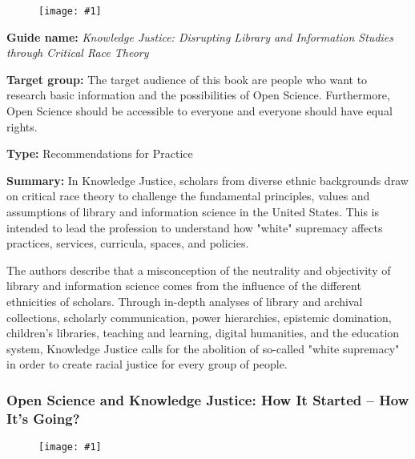 \documentclass{article}
\newlength{\imgwidth}
\newcommand\scaledgraphics[2]{%
                
\settowidth{\imgwidth}{\texttt{[image: \#1]}}%
                
\setlength{\imgwidth}{\minof{\imgwidth}{#2\textwidth}}%
                
\texttt{[image: \#1]}%
                
}
\begin{document}
\begin{center}
\begin{figure}
\scaledgraphics{dcc1d35b-4186-4b50-a5a6-cf54422a8064.jpeg}{0.5}
\label{F29320001}
\end{figure}


\end{center}


\textbf{Guide name:} \emph{Knowledge Justice: Disrupting Library and Information Studies through Critical Race Theory} \autocite{leung_knowledge_2021}


\textbf{Target group: }The target audience of this book are people who want to research basic information and the possibilities of Open Science. Furthermore, Open Science should be accessible to everyone and everyone should have equal rights.


\textbf{Type:} Recommendations for Practice


\textbf{Summary: }In Knowledge Justice, scholars from diverse ethnic backgrounds draw on critical race theory to challenge the fundamental principles, values and assumptions of library and information science in the United States. This is intended to lead the profession to understand how "white" supremacy affects practices, services, curricula, spaces, and policies.


The authors describe that a misconception of the neutrality and objectivity of library and information science comes from the influence of the different ethnicities of scholars. Through in-depth analyses of library and archival collections, scholarly communication, power hierarchies, epistemic domination, children's libraries, teaching and learning, digital humanities, and the education system, Knowledge Justice calls for the abolition of so-called "white supremacy" in order to create racial justice for every group of people.


\subsubsection{Open Science and Knowledge Justice: How It Started – How It’s Going?}\label{H480694}



\begin{center}
\begin{figure}
\scaledgraphics{e590694e-3a8f-4a2f-801f-704d7d8edbc0.png}{0.75}
\label{F3873651}
\end{figure}


\end{center}
\end{document}
